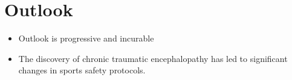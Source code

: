 \section{Outlook}
\begin{itemize}[noitemsep]
  \item Outlook is progressive and incurable
  \item The discovery of chronic traumatic encephalopathy has led to significant changes in sports safety protocols.
\end{itemize}
